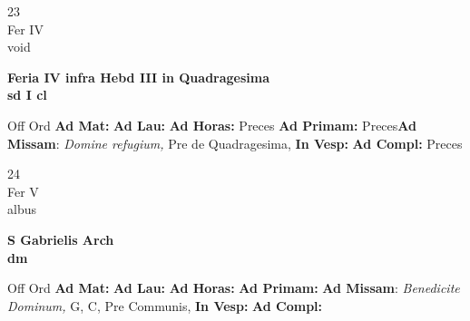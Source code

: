 \documentclass[10pt, openany]{book}
\begin{document}
    \begin{center}
        \begin{minipage}{3.5in}
            \vspace{2em}
            \begin{minipage}{0.5in}
                {\Huge 23} \\
                {\normalsize Fer IV} \\
                {\normalsize void}
            \end{minipage}
            \begin{minipage}{3.0in}
                \textbf{ \large Feria IV infra Hebd III in Quadragesima \\
                \textnormal{\normalsize sd I cl}} \\ 
            \end{minipage}
            \begin{justify}Off Ord
                \textbf{Ad Mat: }
                \textbf{Ad Lau: }
                \textbf{Ad Horas: }Preces
                \textbf{Ad Primam: }Preces\textbf{Ad Missam}: \textit{Domine refugium,} Pre de Quadragesima,  
                \textbf{In Vesp: }
                \textbf{Ad Compl: }Preces
            \end{justify}
        \end{minipage}
    \end{center}

    \begin{center}
        \begin{minipage}{3.5in}
            \vspace{2em}
            \begin{minipage}{0.5in}
                {\Huge 24} \\
                {\normalsize Fer V} \\
                {\normalsize albus}
            \end{minipage}
            \begin{minipage}{3.0in}
                \textbf{ \large S Gabrielis Arch \\
                \textnormal{\normalsize dm}} \\ 
            \end{minipage}
            \begin{justify}Off Ord
                \textbf{Ad Mat: }
                \textbf{Ad Lau: }
                \textbf{Ad Horas: }
                \textbf{Ad Primam: }\textbf{Ad Missam}: \textit{Benedicite Dominum,} G, C, Pre Communis,  
                \textbf{In Vesp: }
                \textbf{Ad Compl: }
            \end{justify}
        \end{minipage}
    \end{center}
\end{document}
